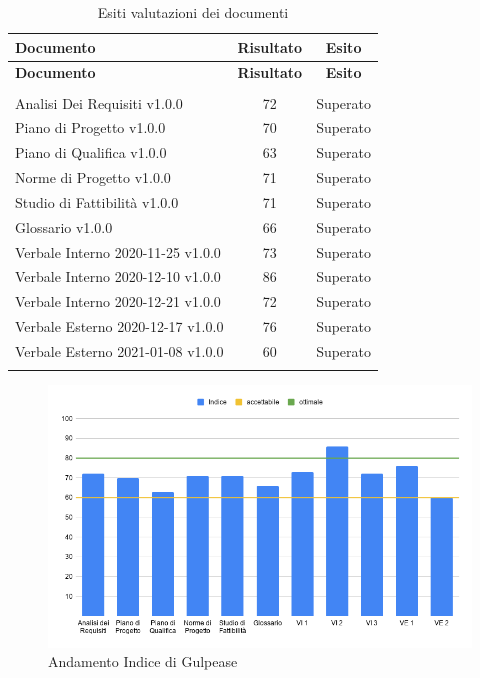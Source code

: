 \documentclass[../piano_di_qualifica.tex]{subfiles}
\begin{document}
\begin{center}
	\begin{longtable}{|l|c|c|}
		\hline
		\rowcolor{lightgray}
		\textbf{Documento}                 & \textbf{Risultato} & \textbf{Esito} \\
		\hline
		\endfirsthead

		\hline
		\rowcolor{lightgray}
		\textbf{Documento}                 & \textbf{Risultato} & \textbf{Esito} \\
		\hline
		\endhead

		\hline
		\rowcolor{white}
		\multicolumn{3}{|c|}{\emph{Continua alla pagina successiva...}}          \\
		\hline
		\endfoot
		\endlastfoot

		Analisi Dei Requisiti v1.0.0       & 72                 & Superato       \\
		Piano di Progetto v1.0.0           & 70                 & Superato       \\
		Piano di Qualifica v1.0.0          & 63                 & Superato       \\
		Norme di Progetto v1.0.0           & 71                 & Superato       \\
		Studio di Fattibilità v1.0.0       & 71                 & Superato       \\
		Glossario v1.0.0                   & 66                 & Superato       \\
		Verbale Interno 2020-11-25 v1.0.0  & 73                 & Superato       \\
		Verbale Interno 2020-12-10 v1.0.0  & 86                 & Superato       \\
		Verbale Interno 2020-12-21 v1.0.0  & 72                 & Superato       \\
		Verbale Esterno 2020-12-17  v1.0.0 & 76                 & Superato       \\
		Verbale Esterno 2021-01-08  v1.0.0 & 60                 & Superato       \\
		\hline
		\rowcolor{white}
		\caption{Esiti valutazioni dei documenti}
	\end{longtable}
\end{center}

\begin{figure}[H]
	\centering
	\includegraphics[width=14cm]{src/img/media_gul_RR.png}
	\caption{Andamento Indice di Gulpease}
\end{figure}
\end{document}
